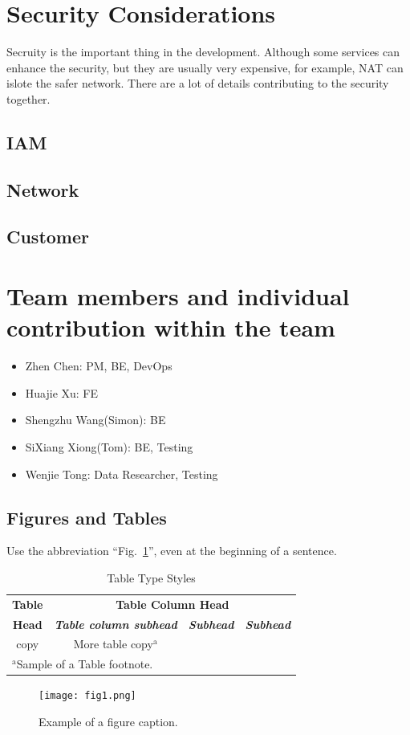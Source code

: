 \documentclass[conference]{IEEEtran}
\begin{document}
	\section{Security Considerations}
	Secruity is the important thing in the development. Although some services can enhance the security, but they are usually very expensive, for example, 
	NAT can islote the safer network. There are a lot of details contributing to the security together.
	
	\subsection{IAM}
	
	\subsection{Network}
	
	\subsection{Customer}
	
	
	
	\section{Team members and individual contribution within the team}
	\begin{itemize}
		\item Zhen Chen:  PM, BE, DevOps
		\item Huajie Xu: FE
		\item Shengzhu Wang(Simon): BE
		\item SiXiang Xiong(Tom): BE, Testing
		\item Wenjie Tong: Data Researcher, Testing
	\end{itemize}
	
	
	\subsection{Figures and Tables}
	Use the abbreviation 
	``Fig.~\ref{fig}'', even at the beginning of a sentence.
	
	\begin{table}[htbp]
		\caption{Table Type Styles}
		\begin{center}
			\begin{tabular}{|c|c|c|c|}
				\hline
				\textbf{Table}&\multicolumn{3}{|c|}{\textbf{Table Column Head}} \\
				\cline{2-4} 
				\textbf{Head} & \textbf{\textit{Table column subhead}}& \textbf{\textit{Subhead}}& \textbf{\textit{Subhead}} \\
				\hline
				copy& More table copy$^{\mathrm{a}}$& &  \\
				\hline
				\multicolumn{4}{l}{$^{\mathrm{a}}$Sample of a Table footnote.}
			\end{tabular}
			\label{tab1}
		\end{center}
	\end{table}
	
	\begin{figure}[htbp]
		\centerline{\texttt{[image: fig1.png]}}
		\caption{Example of a figure caption.}
		\label{fig}
	\end{figure}
	
	
	
	\printbibliography
	
\end{document}
